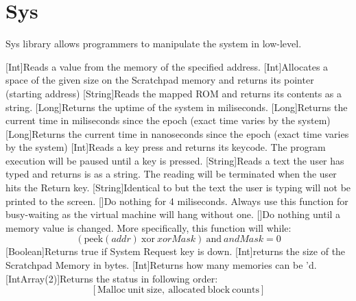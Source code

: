 \section{Sys}

Sys library allows programmers to manipulate the system in low-level.


\begin{outline}
\1
\1[Int]{Reads a value from the memory of the specified address.}
\1[Int]{Allocates a space of the given size on the Scratchpad memory and returns its pointer (starting address)}
\1
\1
\1
\1[String]{Reads the mapped ROM and returns its contents as a string.}
\1[Long]{Returns the uptime of the system in miliseconds.}
\1[Long]{Returns the current time in miliseconds since the epoch (exact time varies by the system)}
\1[Long]{Returns the current time in nanoseconds since the epoch (exact time varies by the system)}
\1
\1
\1[Int]{Reads a key press and returns its keycode. The program execution will be paused until a key is pressed.}
\1[String]{Reads a text the user has typed and returns is as a string. The reading will be terminated when the user hits the Return key.}
\1[String]{Identical to  but the text the user is typing will not be printed to the screen.}
\1[]{Do nothing for 4 miliseconds. Always use this function for busy-waiting as the virtual machine will hang without one.}
\1[]{Do nothing until a memory value is changed. More specifically, this function will  while:$$ (\mathrm{peek}(addr)\ \mathrm{xor}\ xorMask)\ \mathrm{and}\ andMask = 0 $$}
\1[Boolean]{Returns true if System Request key is down.}
\1
\1[Int]{returns the size of the Scratchpad Memory in bytes.}
\1[Int]{Returns how many memories can be 'd.}
\1[IntArray(2)]{Returns the  status in following order:$$ [\mathrm{Malloc\ unit\ size,\ allocated\ block\ counts}] $$}
\end{outline}





